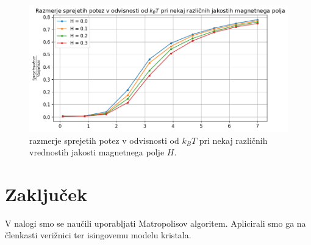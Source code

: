 \documentclass[slovene,11pt,a4paper]{article}
\begin{document}
\begin{figure}[h!]
\centering
\includegraphics[width=\linewidth]{ising7.png}
\caption{razmerje sprejetih potez v odvisnosti od $k_BT$ pri nekaj različnih vrednostih jakosti magnetnega polje $H$.}
\end{figure}

\section{Zaključek}

V nalogi smo se naučili uporabljati Matropolisov algoritem. Aplicirali smo ga na členkasti verižnici ter isingovemu modelu kristala.
\end{document}
